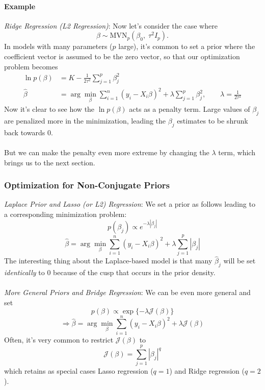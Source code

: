 \documentclass[12pt]{article}
\theoremstyle{plain}
\theoremstyle{definition}
\theoremstyle{remark}
\begin{document}
\paragraph{Example} {\sl Ridge Regression (L2 Regression)}:
Now let's consider the case where
   \[ \beta \sim \text{MVN}_p(\beta_0, \; \tau^2 I_p).\]
In models with many parameters ($p$ large), it's common to set a
prior where the coefficient vector is assumed to be the zero vector,
so that our optimization problem becomes
\begin{align*}
   \ln p(\beta) &= K - \frac{1}{2\tau^2} \sum^p_{j=1} \beta_j^2\\
   \hat{\beta} &= \arg \min_\beta \sum^n_{i=1}
      (y_i - X_i \beta)^2 + \lambda  \sum^p_{j=1} \beta_j^2, \qquad
      \lambda = \frac{1}{2\tau^2}
\end{align*}
Now it's clear to see how the $\ln p(\beta)$ acts as a penalty term.
Large values of $\beta_j$ are penalized more in the minimization,
leading the $\beta_j$ estimates to be shrunk back towards 0.
\\
\\
But we can make the penalty even more extreme by changing the
$\lambda$ term, which brings us to the next section.

\subsubsection{Optimization for Non-Conjugate Priors}

{\sl Laplace Prior and Lasso (or L2) Regression}: We set a prior
as follows leading to a corresponding minimization problem:
\[ p(\beta_j) \propto e^{-\lambda|\beta_j|} \]
\[ \hat{\beta} = \arg \min_\beta \sum^n_{i=1}
   (y_i - X_i \beta)^2 + \lambda  \sum^p_{j=1} |\beta_j| \]
The interesting thing about the Laplace-based model is that many
$\hat{\beta}_j$ will be set \emph{identically} to 0 because of the
cusp that occurs in the prior density.
\\
\\
{\sl More General Priors and Bridge Regression}: We can be even
more general and set
   \[ p(\beta) \propto \exp\{ -\lambda \mathcal{J}(\beta) \} \]
   \[ \Rightarrow \hat{\beta} = \arg \min_\beta \sum^n_{i=1}
      (y_i - X_i \beta)^2 + \lambda  \mathcal{J}(\beta) \]
Often, it's very common to restrict $\mathcal{J}(\beta)$ to
\[ \mathcal{J}(\beta) = \sum^p_{j=1} |\beta_j|^q \]
which retains as special cases Lasso regression ($q=1$) and
Ridge regression ($q=2$).
\end{document}
